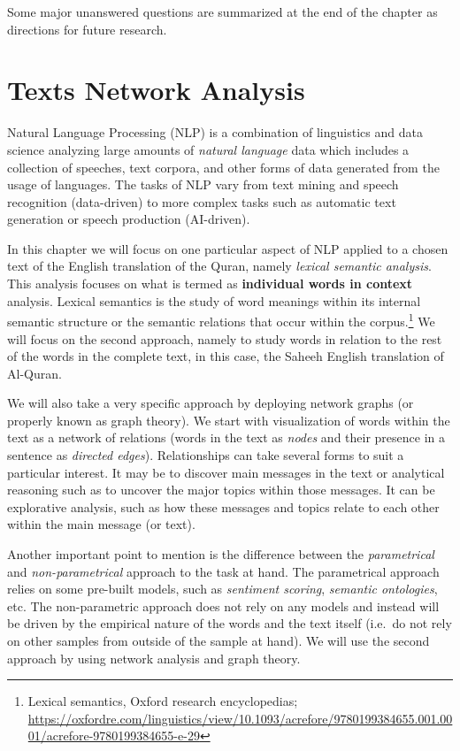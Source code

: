 \documentclass[
]{article}
\begin{document}
Some major unanswered questions are summarized at the end of the chapter as directions for future research.

\hypertarget{text-network-analysis}{%
\section{Texts Network Analysis}\label{text-network-analysis}}

Natural Language Processing (NLP) is a combination of linguistics and data science analyzing large amounts of \emph{natural language} data which includes a collection of speeches, text corpora, and other forms of data generated from the usage of languages. The tasks of NLP vary from text mining and speech recognition (data-driven) to more complex tasks such as automatic text generation or speech production (AI-driven).

In this chapter we will focus on one particular aspect of NLP applied to a chosen text of the English translation of the Quran, namely \emph{lexical semantic analysis}. This analysis focuses on what is termed as \textbf{individual words in context} analysis. Lexical semantics is the study of word meanings within its internal semantic structure or the semantic relations that occur within the corpus.\footnote{Lexical semantics, Oxford research encyclopedias; \url{https://oxfordre.com/linguistics/view/10.1093/acrefore/9780199384655.001.0001/acrefore-9780199384655-e-29}} We will focus on the second approach, namely to study words in relation to the rest of the words in the complete text, in this case, the Saheeh English translation of Al-Quran.

We will also take a very specific approach by deploying network graphs (or properly known as graph theory). We start with visualization of words within the text as a network of relations (words in the text as \emph{nodes} and their presence in a sentence as \emph{directed edges}). Relationships can take several forms to suit a particular interest. It may be to discover main messages in the text or analytical reasoning such as to uncover the major topics within those messages. It can be explorative analysis, such as how these messages and topics relate to each other within the main message (or text).

Another important point to mention is the difference between the \emph{parametrical} and \emph{non-parametrical} approach to the task at hand. The parametrical approach relies on some pre-built models, such as \emph{sentiment scoring}, \emph{semantic ontologies}, etc. The non-parametric approach does not rely on any models and instead will be driven by the empirical nature of the words and the text itself (i.e.~do not rely on other samples from outside of the sample at hand). We will use the second approach by using network analysis and graph theory.
\end{document}
